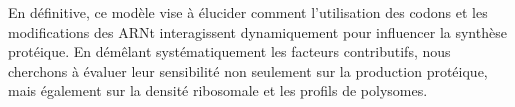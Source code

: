 En définitive, ce modèle vise à élucider comment l’utilisation des codons et les modifications des ARNt interagissent dynamiquement pour influencer la synthèse protéique. En démêlant systématiquement les facteurs contributifs, nous cherchons à évaluer leur sensibilité non seulement sur la production protéique, mais également sur la densité ribosomale et les profils de polysomes.

\cleardoublepage

